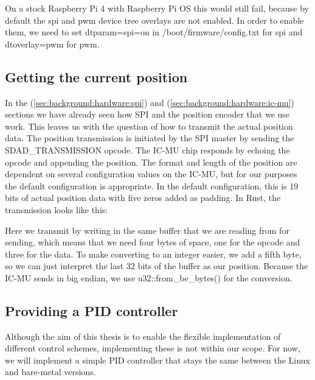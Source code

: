 

On a stock Raspberry Pi 4 with Raspberry Pi OS this would still fail, because by default the spi and pwm device tree overlays are not enabled.
In order to enable them, we need to set dtparam=spi=on in /boot/firmware/config.txt for spi and dtoverlay=pwm for pwm.

\subsection{Getting the current position}

In the  (\ref{sec:background:hardware:spi}) and  (\ref{sec:background:hardware:ic-mu}) sections we have already seen how SPI and the position encoder that we use work.
This leaves us with the question of how to transmit the actual position data.
The position transmission is initiated by the SPI master by sending the SDAD\_TRANSMISSION opcode.
The IC-MU chip responds by echoing the opcode and appending the position.
The format and length of the position are dependent on several configuration values on the IC-MU, but for our purposes the default configuration is appropriate.
In the default configuration, this is 19 bits of actual position data with five zeros added as padding.
In Rust, the transmission looks like this:



Here we transmit by writing in the same buffer that we are reading from for sending, which means that we need four bytes of space, one for the opcode and three for the data.
To make converting to an integer easier, we add a fifth byte, so we can just interpret the last 32 bits of the buffer as our position.
Because the IC-MU sends in big endian, we use u32::from\_be\_bytes() for the conversion.

\subsection{Providing a PID controller}

Although the aim of this thesis is to enable the flexible implementation of different control schemes, implementing these is not within our scope.
For now, we will implement a simple PID controller that stays the same between the Linux and bare-metal versions.

